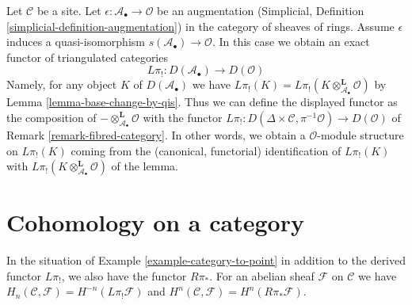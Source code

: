 \begin{remark}
\label{remark-homology-augmentation}
Let $\mathcal{C}$ be a site. Let
$\epsilon : \mathcal{A}_\bullet \to \mathcal{O}$ be an augmentation
(Simplicial, Definition \ref{simplicial-definition-augmentation})
in the category of sheaves of rings.
Assume $\epsilon$ induces a quasi-isomorphism
$s(\mathcal{A}_\bullet) \to \mathcal{O}$.
In this case we obtain an exact functor of triangulated categories
$$
L\pi_! : D(\mathcal{A}_\bullet) \longrightarrow D(\mathcal{O})
$$
Namely, for any object $K$ of $D(\mathcal{A}_\bullet)$ we have
$L\pi_!(K) = L\pi_!(K \otimes_{\mathcal{A}_\bullet}^\mathbf{L} \mathcal{O})$
by Lemma \ref{lemma-base-change-by-qis}.
Thus we can define the displayed functor as the composition of
$- \otimes^\mathbf{L}_{\mathcal{A}_\bullet} \mathcal{O}$ with the functor
$L\pi_! : D(\Delta \times \mathcal{C}, \pi^{-1}\mathcal{O}) \to
D(\mathcal{O})$ of Remark \ref{remark-fibred-category}.
In other words, we obtain a $\mathcal{O}$-module structure on $L\pi_!(K)$
coming from the (canonical, functorial) identification of $L\pi_!(K)$ with
$L\pi_!(K \otimes_{\mathcal{A}_\bullet}^\mathbf{L} \mathcal{O})$ of the lemma.
\end{remark}






\section{Cohomology on a category}
\label{section-cohomology}

\noindent
In the situation of Example \ref{example-category-to-point}
in addition to the derived functor $L\pi_!$, we also have the functor
$R\pi_*$. For an abelian sheaf $\mathcal{F}$ on $\mathcal{C}$
we have $H_n(\mathcal{C}, \mathcal{F}) = H^{-n}(L\pi_!\mathcal{F})$
and $H^n(\mathcal{C}, \mathcal{F}) = H^n(R\pi_*\mathcal{F})$.

